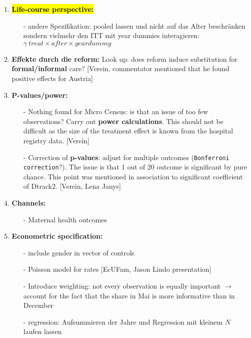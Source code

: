 \documentclass[11pt,a4paper]{article}
\begin{document}
{\begin{enumerate}
\item \textbf{\hl{Life-course perspective:}}\vspace{-1em}
\begin{itemize}
	\item[-]andere Spezifikation: pooled lassen und nicht auf das Alter beschränken sondern 	vielmehr den ITT mit year dummies interagieren: \newline
	$\gamma\  treat \times after \times yeardummy$
\end{itemize}


\item \textbf{Effekte durch die reform:}\newline
Look up: does reform induce substitution for \textbf{formal/informal} care? [Verein, commentator mentioned that he found positive effects for Austria] 


\item \textbf{P-values/power:}\vspace{-1em}
\begin{itemize}
	\item[-] Nothing found for Micro Census: is that an issue of too few observations? Carry out \textbf{power calculations}. This should not be difficult as the size of the treatment effect is known from the hospital registry data. [Verein]
	\item[-] Correction of \textbf{p-values}: adjust for multiple outcomes (\texttt{Bonferroni correction}?). The issue is that 1 out of 20 outcome is significant by pure chance. This point was mentioned in association to significant coefficient of Dtrack2. [Verein, Lena Janys]
\end{itemize}


\item \textbf{Channels:}\vspace{-1em}
\begin{itemize}
	\item[-] Maternal health outcomes
\end{itemize}


\item \textbf{Econometric specification:}\vspace{-1em}
\begin{itemize}
	\item[-] include gender in vector of controls
	\item[-] Poisson model for rates [EcUFam, Jason Lindo presentation]
	\item[-] Introduce weighting: not every observation is equally important $\rightarrow$ account for the fact that the share in Mai is more informative than in December
	\item[-] regression: Aufsummieren der Jahre und Regression mit kleinem $N$ laufen lassen
\end{itemize}



\end{enumerate}}
\end{document}
